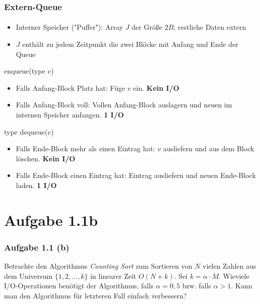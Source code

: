 \documentclass{beamer}
\begin{document}
\begin{frame}
  \frametitle{Extern-Queue}
  \framesubtitle{}
  \begin{itemize}[<+->]
    \item Interner Speicher ("Puffer"): Array $J$ der Größe $2B$; restliche Daten extern
    \item $J$ enthält zu jedem Zeitpunkt die zwei Blöcke mit Anfang und Ende der Queue
  \end{itemize}

  enqueue(type $v$)
  \begin{itemize}[<+->]
    \item Falls Anfang-Block Platz hat: Füge $v$ ein. \bf{Kein I/O}
    \item Falls Anfang-Block voll: Vollen Anfang-Block auslagern und neuen im internen Speicher anfangen. \bf{1 I/O}
  \end{itemize}

  type dequeue($v$)
  \begin{itemize}[<+->]
    \item Falls Ende-Block mehr als einen Eintrag hat: $v$ ausliefern und aus dem Block löschen. \bf{Kein I/O}
    \item Falls Ende-Block einen Eintrag hat: Eintrag ausliefern und neuen Ende-Block laden. \bf{1 I/O}
  \end{itemize}
\end{frame}


\section{Aufgabe 1.1b}
\begin{frame}
  \frametitle{Aufgabe 1.1 (b)}

  Betrachte den Algorithmus \emph{Counting Sort} zum Sortieren von $N$ vielen Zahlen aus dem Universum $\{1,2,\dots{},k\}$ in linearer Zeit $O(N+k)$. 
  Sei $k = \alpha \cdot M$.
  Wieviele I/O-Operationen benötigt der Algorithmus, falls $\alpha = 0,5$ bzw. falls $\alpha > 1$.
  Kann man den Algorithmus für letzteren Fall einfach verbessern?
\end{frame}
\end{document}
